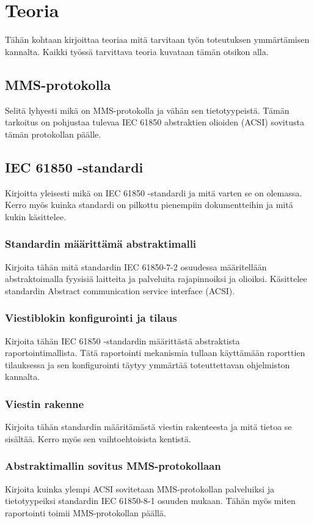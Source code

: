 \chapter{Teoria}
\label{ch:teoria}
Tähän kohtaan kirjoittaa teoriaa mitä tarvitaan työn toteutuksen ymmärtämisen kannalta. Kaikki työssä tarvittava teoria kuvataan tämän otsikon alla.

\section{MMS-protokolla}
Selitä lyhyesti mikä on MMS-protokolla ja vähän sen tietotyypeistä. Tämän tarkoitus on pohjustaa tulevaa IEC 61850 abstraktien olioiden (ACSI) sovitusta tämän protokollan päälle.

\section{IEC 61850 -standardi}
Kirjoitta yleisesti mikä on IEC 61850 -standardi ja mitä varten se on olemassa. Kerro myös kuinka standardi on pilkottu pienempiin dokumentteihin ja mitä kukin käsittelee.

\subsection{Standardin määrittämä abstraktimalli}
Kirjoita tähän mitä standardin IEC 61850-7-2 osuudessa määritellään abstraktoimalla fyysisiä laitteita ja palveluita rajapinnoiksi ja olioiksi. Käsittelee standardin Abstract communication service interface (ACSI).

\subsection{Viestiblokin konfigurointi ja tilaus}
Kirjoita tähän IEC 61850 -standardin määrittästä abstraktista raportointimallista. Tätä raportointi mekanismia tullaan käyttämään raporttien tilauksessa ja sen konfigurointi täytyy ymmärtää toteuttettavan ohjelmiston kannalta.

\subsection{Viestin rakenne}
Kirjoita tähän standardin määritämästä viestin rakenteesta ja mitä tietoa se sisältää. Kerro myös sen vaihtoehtoisista kentistä.

\subsection{Abstraktimallin sovitus MMS-protokollaan}
Kirjoita kuinka ylempi ACSI sovitetaan MMS-protokollan palveluiksi ja tietotyypeiksi standardin IEC 61850-8-1 osuuden mukaan. Tähän myös miten raportointi toimii MMS-protokollan päällä.

